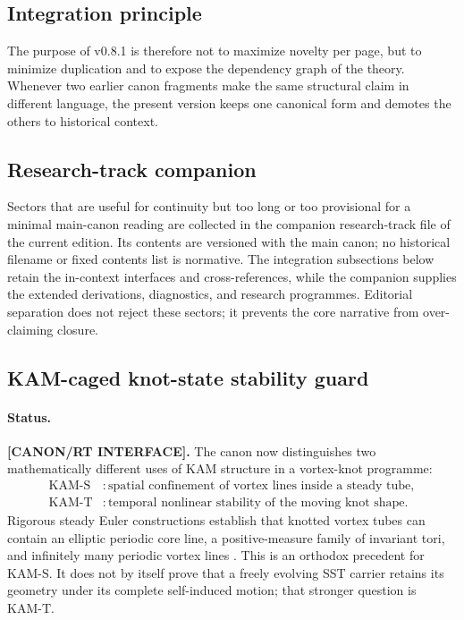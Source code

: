 \documentclass[11pt]{article}
\theoremstyle{definition}
\theoremstyle{plain}
\theoremstyle{remark}
\begin{document}
    \subsection{Integration principle}
        The purpose of v0.8.1 is therefore not to maximize novelty per page, but to minimize duplication and to expose the dependency graph of the theory. Whenever two earlier canon fragments make the same structural claim in different language, the present version keeps one canonical form and demotes the others to historical context.

    \subsection{Research-track companion}
        Sectors that are useful for continuity but too long or too provisional for a minimal main-canon reading are collected in the companion research-track file of the current edition.  Its contents are versioned with the main canon; no historical filename or fixed contents list is normative.  The integration subsections below retain the in-context interfaces and cross-references, while the companion supplies the extended derivations, diagnostics, and research programmes.  Editorial separation does not reject these sectors; it prevents the core narrative from over-claiming closure.

    \subsection{KAM-caged knot-state stability guard}
        \label{subsec:canon_kam_caged_knot_guard}

        \paragraph{Status.}
        \textbf{[CANON/RT INTERFACE].}
        The canon now distinguishes two mathematically different uses of KAM
        structure in a vortex-knot programme:
        \begin{align}
            \mathrm{KAM\mbox{-}S}
            &:
            \text{spatial confinement of vortex lines inside a steady tube},
            \\
            \mathrm{KAM\mbox{-}T}
            &:
            \text{temporal nonlinear stability of the moving knot shape}.
            \label{eq:canon_kam_spatial_temporal_split}
        \end{align}
        Rigorous steady Euler constructions establish that knotted vortex tubes
        can contain an elliptic periodic core line, a positive-measure family of
        invariant tori, and infinitely many periodic vortex lines
        \cite{KhesinKuksinPeraltaSalas2014,EncisoPeraltaSalas2015}.  This is an
        orthodox precedent for \(\mathrm{KAM\mbox{-}S}\).  It does not by itself
        prove that a freely evolving SST carrier retains its geometry under its
        complete self-induced motion; that stronger question is
        \(\mathrm{KAM\mbox{-}T}\).
\end{document}
